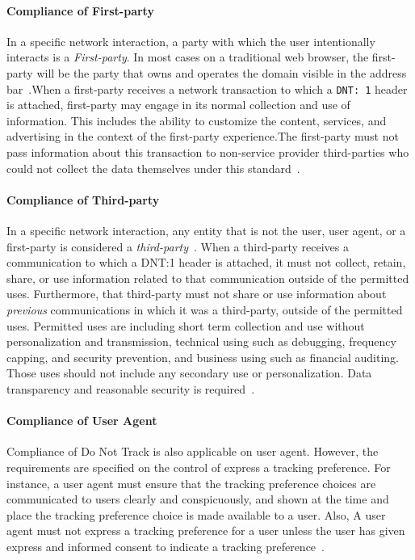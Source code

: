 \documentclass{sig-alternate}
\begin{document}
\paragraph{Compliance of First-party}

In a specific network interaction, a party with which the user intentionally interacts is a \emph{First-party}. In most cases on a traditional web browser, the first-party will be the party that owns and operates the domain visible in the address bar~\cite{w3ctrackingcompliance}.When a first-party receives a network transaction to which a \verb|DNT: 1| header is attached, first-party may engage in its normal collection and use of information. This includes the ability to customize the content, services, and advertising in the context of the first-party experience.The first-party must not pass information about this transaction to non-service provider third-parties who could not collect the data themselves under this standard~\cite{w3ctrackingcompliance}.

\paragraph{Compliance of Third-party}

In a specific network interaction, any entity that is not the user, user agent, or a first-party is considered a \emph{third-party}~\cite{w3ctrackingcompliance}. When a third-party receives a communication to which a DNT:1 header is attached, it must not collect, retain, share, or use information related to that communication outside of the permitted uses. Furthermore, that third-party must not share or use information about \emph{previous} communications in which it was a third-party, outside of the permitted uses. Permitted uses are including short term collection and use without personalization and transmission, technical using such as debugging, frequency capping, and security prevention, and business using such as financial auditing. Those uses should not include any secondary use or personalization. Data transparency and reasonable security is required~\cite{w3ctrackingcompliance}.

\paragraph{Compliance of User Agent}

Compliance of Do Not Track is also applicable on user agent. However, the requirements are specified on the control of express a tracking preference. For instance, a user agent must ensure that the tracking preference choices are communicated to users clearly and conspicuously, and shown at the time and place the tracking preference choice is made available to a user. Also, A user agent must not express a tracking preference for a user unless the user has given express and informed consent to indicate a tracking preference~\cite{w3ctrackingcompliance}.
\end{document}
